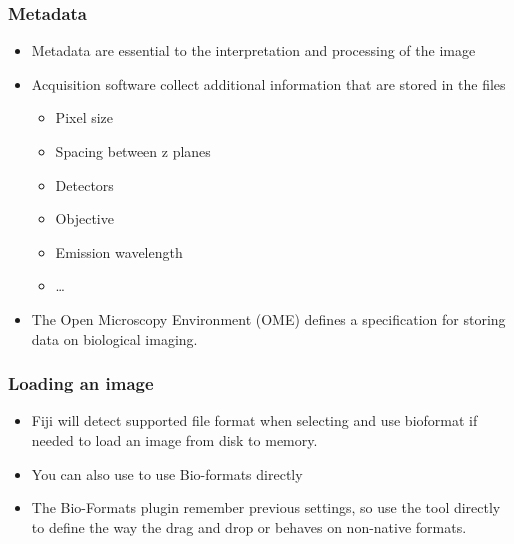 \documentclass[ignorenonframetext,aspectratio=169,10pt,xcolor=table]{beamer}
\begin{document}
\begin{frame} \frametitle{Metadata}
  \begin {itemize}
  \item Metadata are essential to the interpretation and processing of
    the image
  \item Acquisition software collect additional information that are
    stored in the files
    \begin{itemize}
    \item Pixel size
    \item Spacing between z planes
    \item Detectors
    \item Objective
    \item Emission wavelength
    \item \dots
    \end{itemize}
  \item The Open Microscopy Environment (OME) defines a specification
    for storing data on biological imaging.
  \end{itemize} 
\end{frame}

\begin{frame} \frametitle{Loading an image}
  \begin{itemize}
  \item Fiji will detect supported file format when selecting
     and use bioformat if needed to load an image from
    disk to memory.
  \item You can also use  to use Bio-formats directly
  \item The Bio-Formats plugin remember previous settings, so use
    the tool directly to define the way the drag and drop or
     behaves on non-native formats.
  \end{itemize}
\end{frame}
\end{document}
